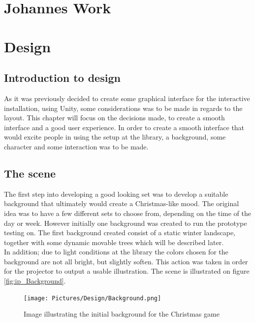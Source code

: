 \chapter{Johannes Work}
\chapter{Design}
\section{Introduction to design}
As it was previously decided to create some graphical interface for the interactive installation, using Unity, some considerations was to be made in regards to the layout. This chapter will focus on the decisions made, to create a smooth interface and a good user experience. In order to create a smooth interface that would excite people in using the setup at the library, a background, some character and some interaction was to be made.

\section{The scene}
The first step into developing a good looking set was to develop a suitable background that ultimately would create a Christmas-like mood. The original idea was to have a few different sets to choose from, depending on the time of the day or week. However initially one background was created to run the prototype testing on. The first background created consist of a static winter landscape, together with some dynamic movable trees which will be described later.\\
In addition; due to light conditions at the library the colors chosen for the background are not all bright, but slightly soften. This action was taken in order for the projector to output a usable illustration. The scene is illustrated on  figure \eqref{fig:ip_Background}.

\begin{figure}[htbp]
\centering
\texttt{[image: Pictures/Design/Background.png]}
\caption{Image illustrating the initial background for the Christmas game}
\label{fig:ip_Background}
\end{figure}

